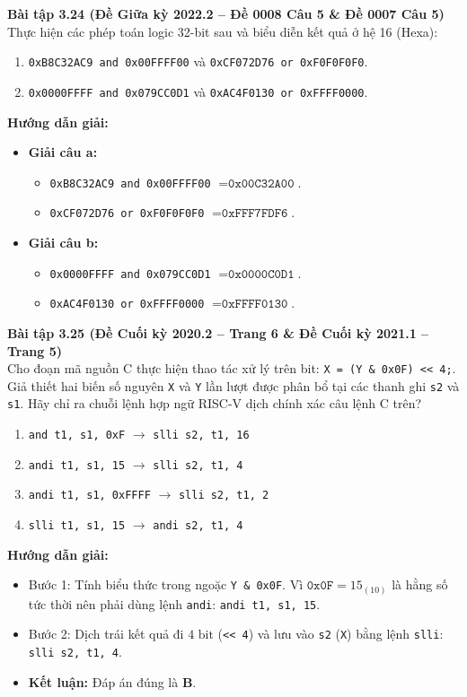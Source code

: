 \textbf{Bài tập 3.24 (Đề Giữa kỳ 2022.2 -- Đề 0008 Câu 5 \& Đề 0007 Câu 5)}\\
Thực hiện các phép toán logic 32-bit sau và biểu diễn kết quả ở hệ 16 (Hexa):
\begin{enumerate}[label=\alph*)]
    \item \texttt{0xB8C32AC9 and 0x00FFFF00} \quad và \quad \texttt{0xCF072D76 or 0xF0F0F0F0}.
    \item \texttt{0x0000FFFF and 0x079CC0D1} \quad và \quad \texttt{0xAC4F0130 or 0xFFFF0000}.
\end{enumerate}
\textbf{Hướng dẫn giải:}
\begin{itemize}
    \item \textbf{Giải câu a:}
    \begin{itemize}
        \item \texttt{0xB8C32AC9 and 0x00FFFF00} $= \mathbf{\texttt{0x00C32A00}}$.
        \item \texttt{0xCF072D76 or 0xF0F0F0F0} $= \mathbf{\texttt{0xFFF7FDF6}}$.
    \end{itemize}
    \item \textbf{Giải câu b:}
    \begin{itemize}
        \item \texttt{0x0000FFFF and 0x079CC0D1} $= \mathbf{\texttt{0x0000C0D1}}$.
        \item \texttt{0xAC4F0130 or 0xFFFF0000} $= \mathbf{\texttt{0xFFFF0130}}$.
    \end{itemize}
\end{itemize}

\textbf{Bài tập 3.25 (Đề Cuối kỳ 2020.2 -- Trang 6 \& Đề Cuối kỳ 2021.1 -- Trang 5)}\\
Cho đoạn mã nguồn C thực hiện thao tác xử lý trên bit: \texttt{X = (Y \& 0x0F) << 4;}. Giả thiết hai biến số nguyên \texttt{X} và \texttt{Y} lần lượt được phân bổ tại các thanh ghi \texttt{s2} và \texttt{s1}. Hãy chỉ ra chuỗi lệnh hợp ngữ RISC-V dịch chính xác câu lệnh C trên?
\begin{enumerate}[label=\Alph*.]
    \item \texttt{and t1, s1, 0xF} $\rightarrow$ \texttt{slli s2, t1, 16}
    \item \texttt{andi t1, s1, 15} $\rightarrow$ \texttt{slli s2, t1, 4}
    \item \texttt{andi t1, s1, 0xFFFF} $\rightarrow$ \texttt{slli s2, t1, 2}
    \item \texttt{slli t1, s1, 15} $\rightarrow$ \texttt{andi s2, t1, 4}
\end{enumerate}
\textbf{Hướng dẫn giải:}
\begin{itemize}
    \item Bước 1: Tính biểu thức trong ngoặc \texttt{Y \& 0x0F}. Vì $\texttt{0x0F} = 15_{(10)}$ là hằng số tức thời nên phải dùng lệnh \texttt{andi}: \texttt{andi t1, s1, 15}.
    \item Bước 2: Dịch trái kết quả đi $4\text{ bit}$ (\texttt{<< 4}) và lưu vào \texttt{s2} (\texttt{X}) bằng lệnh \texttt{slli}: \texttt{slli s2, t1, 4}.
    \item \textbf{Kết luận:} Đáp án đúng là \textbf{B}.
\end{itemize}

